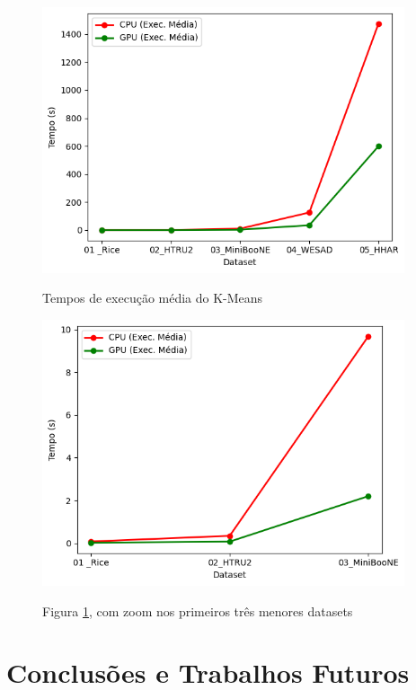 \documentclass[12pt,
openright, 
oneside, %
a4paper,    %
brazil]{facom-ufu-abntex2}
\begin{document}
\begin{figure}[h]
  \caption{Tempos de execução média do K-Means}
  \centering
  \includegraphics[width=0.95\textwidth]{kMeansResultsAvg.png}
  \label{fig:kMeansAvg}
\end{figure}

\begin{figure}[h]
  \caption{Figura \ref{fig:kMeansAvg}, com zoom nos primeiros três menores datasets}
  \centering
  \includegraphics[width=0.95\textwidth]{kMeansResultsAvgZoomed.png}
  \label{fig:kMeansAvgZoomed}
\end{figure}






\chapter{Conclusões e Trabalhos Futuros}
\end{document}
